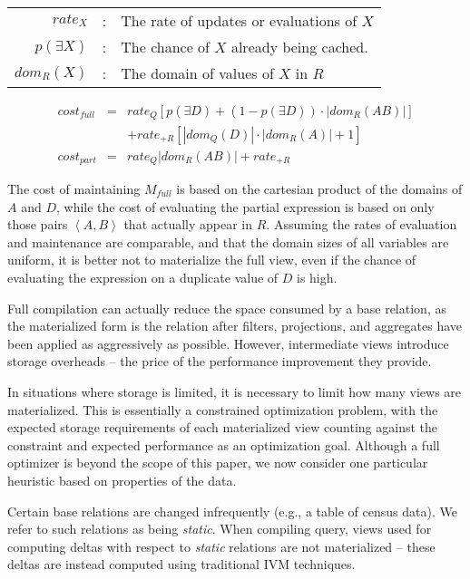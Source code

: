 \vspace*{0.07in}
{\small
\begin{tabular}{rcl}
$rate_X$ & : & The rate of updates or evaluations of $X$\\
$p(\exists X)$ & : & The chance of $X$ already being cached.\\
$dom_R(X)$ & : & The domain of values of $X$ in $R$\\
\end{tabular}
\vspace*{-0.09in}
\begin{eqnarray*}
cost_{full} & = & rate_{Q} \left[p(\exists D) + (1-p(\exists D))\cdot|dom_R(AB)|\right] \\
 &  & + rate_{+R} \left[|dom_Q(D)|\cdot|dom_R(A)| + 1\right]\\
cost_{part} & = & rate_{Q} |dom_R(AB)| + rate_{+R}
\end{eqnarray*}
}
The cost of maintaining $M_{full}$ is based on the cartesian product of the domains of $A$ and $D$, while the cost of evaluating the partial expression is based on only those pairs $\left<A,B\right>$ that actually appear in $R$.  Assuming the rates of evaluation and maintenance are comparable, and that the domain sizes of all variables are uniform, it is better not to materialize the full view, even if the chance of evaluating the expression on a duplicate value of $D$ is high.

Full compilation can actually reduce the space consumed by a base relation, as the materialized form is the relation after filters, projections, and aggregates have been applied as aggressively as possible.  However, intermediate views introduce storage overheads -- the price of the performance improvement they provide.

In situations where storage is limited, it is necessary to limit how many views are materialized.  This is essentially a constrained optimization problem, with the expected storage requirements of each materialized view counting against the constraint and expected performance as an optimization goal.  Although a full optimizer is beyond the scope of this paper, we now consider one particular heuristic based on properties of the data.

Certain base relations are changed infrequently (e.g., a table of census data).  We refer to such relations as being {\em static}.  When compiling query, views used for computing deltas with respect to {\em static} relations are not materialized -- these deltas are instead computed using traditional IVM techniques.   

